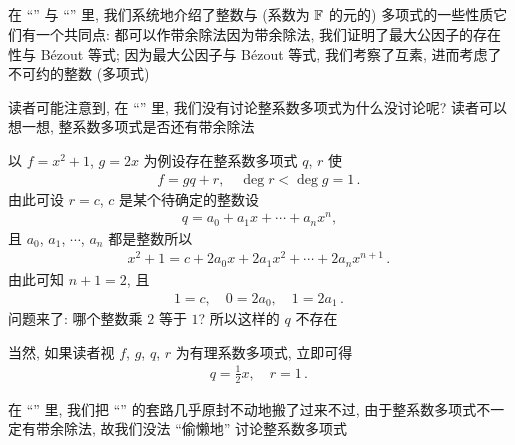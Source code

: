 \subsection*{\PolynomialsOverZAndOverQ}
\markright{\PolynomialsOverZAndOverQ}

在 ``\SomePropertiesOfIntegers '' 与 ``\SomePropertiesOfPolynomials '' 里, 我们系统地介绍了整数与 (系数为 $\mathbb{F}$ 的元的) 多项式的一些性质\period 它们有一个共同点: 都可以作带余除法\period 因为带余除法, 我们证明了最大公因子的存在性与 Bézout 等式; 因为最大公因子与 Bézout 等式, 我们考察了互素, 进而考虑了不可约的整数 (多项式)\period

读者可能注意到, 在 ``\SomePropertiesOfPolynomials '' 里, 我们没有讨论整系数多项式\period 为什么没讨论呢? 读者可以想一想, 整系数多项式是否还有带余除法\period

\begin{example}
    以 $f = x^2 + 1$, $g = 2x$ 为例\period 设存在整系数多项式 $q$, $r$ 使
    \begin{align*}
        f = gq + r, \quad \deg r < \deg g = 1 \period
    \end{align*}
    由此可设 $r = c$, $c$ 是某个待确定的整数\period 设
    \begin{align*}
        q = a_0 + a_1 x + \cdots + a_n x^n,
    \end{align*}
    且 $a_0$, $a_1$, $\cdots$, $a_n$ 都是整数\period 所以
    \begin{align*}
        x^2 + 1 = c + 2a_0 x + 2a_1 x^2 + \cdots + 2a_n x^{n+1} \period
    \end{align*}
    由此可知 $n+1 = 2$, 且
    \begin{align*}
        1 = c, \quad 0 = 2a_0, \quad 1 = 2a_1 \period
    \end{align*}
    问题来了: 哪个整数乘 $2$ 等于 $1$? 所以这样的 $q$ 不存在\period

    当然, 如果读者视 $f$, $g$, $q$, $r$ 为有理系数多项式, 立即可得
    \begin{align*}
        q = \frac{1}{2}x, \quad r = 1 \period
    \end{align*}
\end{example}

在 ``\SomePropertiesOfPolynomials '' 里, 我们把 ``\SomePropertiesOfIntegers '' 的套路几乎原封不动地搬了过来\period 不过, 由于整系数多项式不一定有带余除法, 故我们没法 ``偷懒地'' 讨论整系数多项式\period

